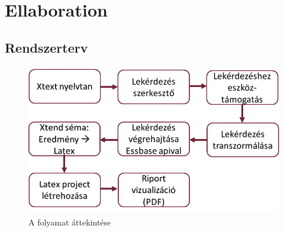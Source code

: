 \chapter{Ellaboration}\label{sect:Ellaboration}
\section{Rendszerterv}

\begin{figure}[!ht]
\centering
\includegraphics[width=150mm, keepaspectratio]{figures/overview.png}
\caption{A folyamat áttekintése} 
\label{fig:Overview}
\end{figure}
